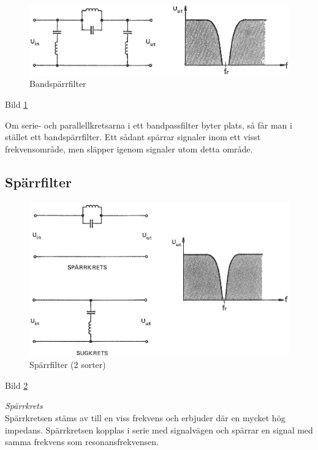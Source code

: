 \begin{figure}
\includegraphics[width=\textwidth]{images/bild_2_3-26.png}
\caption{Bandspärrfilter}
\label{fig:BildII3-26}
\end{figure}

Bild \ref{fig:BildII3-26}

Om serie- och parallellkretsarna i ett bandpassfilter byter plats, så får man
i stället ett bandspärrfilter. Ett sådant spärrar signaler inom ett visst
frekvensområde, men släpper igenom signaler utom detta område.

\subsection{Spärrfilter}

\begin{figure}
\includegraphics[width=\textwidth]{images/bild_2_3-27.png}
\caption{Spärrfilter (2 sorter)}
\label{fig:BildII3-27}
\end{figure}

Bild \ref{fig:BildII3-27}

\emph{Spärrkrets} \\
Spärrkretsen stäms av till en viss frekvens och erbjuder där en mycket hög
impedans. Spärrkretsen kopplas i serie med signalvägen och spärrar en signal
med samma frekvens som resonansfrekvensen.

